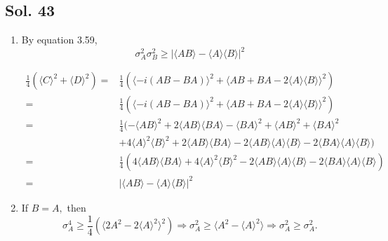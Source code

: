 \subsection*{Sol. 43}
\begin{enumerate}
    \item 
    By equation 3.59, 
    $$
    \sigma_A^2\sigma_B^2\geq |\langle AB\rangle-\langle A\rangle\langle B\rangle|^2
    $$

    \begin{align*}
        \frac{1}{4}(\langle C\rangle^2+\langle D\rangle^2)
    =&
    \frac{1}{4}
    (\langle -i(AB-BA)\rangle^2 + \langle AB+BA-2\langle A\rangle\langle B\rangle\rangle^2)\\
    =&
    \frac{1}{4}
    (\langle -i(AB-BA)\rangle^2 + \langle AB+BA-2\langle A\rangle\langle B\rangle\rangle^2)\\
    =&
    \frac{1}{4}
    (-\langle AB\rangle^2+2\langle AB\rangle\langle BA\rangle
    -\langle BA\rangle^2
    + \langle AB\rangle^2 
    + \langle BA\rangle^2\\
    &+ 4\langle A\rangle^2\langle B\rangle^2
    + 2\langle AB\rangle\langle BA\rangle
    -2\langle AB\rangle\langle A\rangle\langle B\rangle
    -2\langle BA\rangle\langle A\rangle\langle B\rangle
    )\\
    =&
    \frac{1}{4}(4\langle AB\rangle\langle BA\rangle+
    4\langle A\rangle^2\langle B\rangle^2
    -2\langle AB\rangle\langle A\rangle\langle B\rangle
    -2\langle BA\rangle\langle A\rangle\langle B\rangle
    )\\
    =&|\langle AB\rangle-\langle A\rangle\langle B\rangle|^2
    \end{align*}
    \item If $B=A,$ then
    $$
    \sigma_A^4\geq 
    \frac{1}{4}(\langle 2A^2-2\langle A\rangle^2\rangle^2)
    \Rightarrow 
    \sigma_A^2\geq 
    \langle A^2-\langle A\rangle^2\rangle
    \Rightarrow \sigma_A^2\geq \sigma_A^2.
    $$
\end{enumerate}


